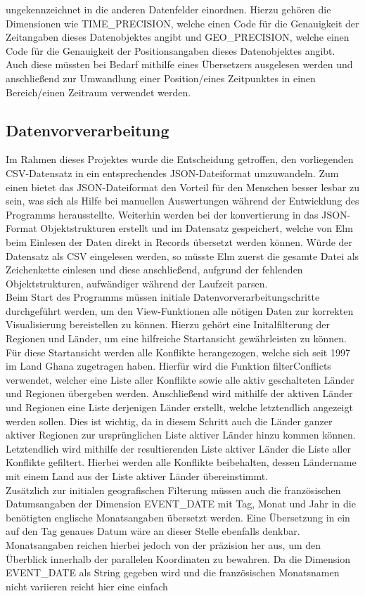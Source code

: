 \documentclass[usegeometry=true]{scrartcl}
\begin{document}
ungekennzeichnet in die anderen Datenfelder einordnen. Hierzu gehören die Dimensionen wie TIME\_PRECISION, welche einen Code für die Genauigkeit der Zeitangaben dieses Datenobjektes angibt und GEO\_PRECISION, welche einen Code für die Genauigkeit der Positionsangaben dieses Datenobjektes angibt. Auch diese müssten bei Bedarf mithilfe eines Übersetzers ausgelesen werden und anschließend zur Umwandlung einer Position/eines Zeitpunktes in einen Bereich/einen Zeitraum verwendet werden.\\

\subsection{Datenvorverarbeitung} \label{sec:datenvorverarbeitung}
Im Rahmen dieses Projektes wurde die Entscheidung getroffen, den vorliegenden CSV-Datensatz in ein entsprechendes JSON-Dateiformat umzuwandeln. Zum einen bietet das JSON-Dateiformat den Vorteil für den Menschen besser lesbar zu sein, was sich als Hilfe bei manuellen Auswertungen während der Entwicklung des Programms herausstellte. Weiterhin werden bei der konvertierung in das JSON-Format Objektstrukturen erstellt und im Datensatz gespeichert, welche von Elm beim Einlesen der Daten direkt in Records übersetzt werden können. Würde der Datensatz als CSV eingelesen werden, so müsste Elm zuerst die gesamte Datei als Zeichenkette einlesen und diese anschließend, aufgrund der fehlenden Objektstrukturen, aufwändiger während der Laufzeit parsen.\\ Beim Start des Programms müssen initiale Datenvorverarbeitungschritte durchgeführt werden, um den View-Funktionen alle nötigen Daten zur korrekten Visualisierung bereistellen zu können. Hierzu gehört eine Initalfilterung der Regionen und Länder, um eine hilfreiche Startansicht gewährleisten zu können. Für diese Startansicht werden alle Konflikte herangezogen, welche sich seit 1997 im Land Ghana zugetragen haben. Hierfür wird die Funktion filterConflicts verwendet, welcher eine Liste aller Konflikte sowie alle aktiv geschalteten Länder und Regionen übergeben werden. Anschließend wird mithilfe der aktiven Länder und Regionen eine Liste derjenigen Länder erstellt, welche letztendlich angezeigt werden sollen. Dies ist wichtig, da in diesem Schritt auch die Länder ganzer aktiver Regionen zur ursprünglichen Liste aktiver Länder hinzu kommen können. Letztendlich wird mithilfe der resultierenden Liste aktiver Länder die Liste aller Konflikte gefiltert. Hierbei werden alle Konflikte beibehalten, dessen Ländername mit einem Land aus der Liste aktiver Länder übereinstimmt.\\ Zusätzlich zur initialen geografischen Filterung müssen auch die französischen Datumsangaben der Dimension EVENT\_DATE mit Tag, Monat und Jahr in die benötigten englische Monatsangaben übersetzt werden. Eine Übersetzung in ein auf den Tag genaues Datum wäre an dieser Stelle ebenfalls denkbar. Monatsangaben reichen hierbei jedoch von der präzision her aus, um den Überblick innerhalb der parallelen Koordinaten zu bewahren. Da die Dimension EVENT\_DATE als String gegeben wird und die französischen Monatsnamen nicht variieren reicht hier eine einfach 
\end{document}
